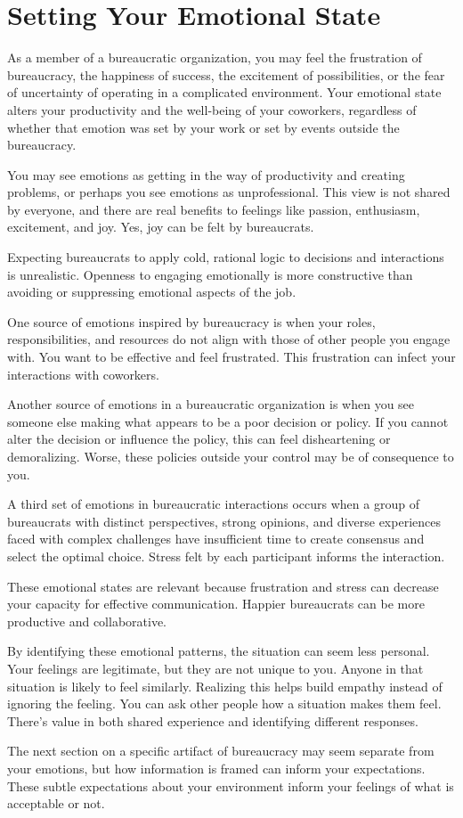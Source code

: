 \section{Setting Your Emotional State}

As a member of a bureaucratic organization, you may feel the frustration of bureaucracy, the happiness of success, the excitement of possibilities, or the fear of uncertainty of operating in a complicated environment. Your emotional state alters your productivity and the well-being of your coworkers, regardless of whether that emotion was set by your work or set by events outside the bureaucracy. 

You may see emotions as getting in the way of productivity and creating problems, or perhaps you see emotions as unprofessional. This view is not shared by everyone, and there are real benefits to feelings like passion, enthusiasm, excitement, and joy. Yes, joy can be felt by bureaucrats. 

Expecting bureaucrats to apply cold, rational logic to decisions and interactions is unrealistic. Openness to engaging emotionally is more constructive than avoiding or suppressing emotional aspects of the job. 

One source of emotions inspired by bureaucracy is when your roles, responsibilities, and resources do not align with those of other people you engage with. You want to be effective and feel frustrated. This frustration can infect your interactions with coworkers. 

Another source of emotions in a bureaucratic organization is when you see someone else making what appears to be a poor decision or policy. If you cannot alter the decision or influence the policy, this can feel disheartening or demoralizing. Worse, these policies outside your control may be of consequence to you. 

A third set of emotions in bureaucratic interactions occurs when a group of bureaucrats with distinct perspectives, strong opinions, and diverse experiences faced with complex challenges have insufficient time to create consensus and select the optimal choice. Stress felt by each participant informs the interaction. 

These emotional states are relevant because frustration and stress can decrease your capacity for effective communication. Happier bureaucrats can be more productive and collaborative. 

By identifying these emotional patterns, the situation can seem less personal. Your feelings are legitimate, but they are not unique to you. Anyone in that situation is likely to feel similarly. Realizing this helps build empathy instead of ignoring the feeling.  You can ask other people how a situation makes them feel. There's value in both shared experience and identifying different responses. 

The next section on a specific artifact of bureaucracy may seem separate from your emotions, but how information is framed can inform your expectations. These subtle expectations about your environment inform your feelings of what is acceptable or not.